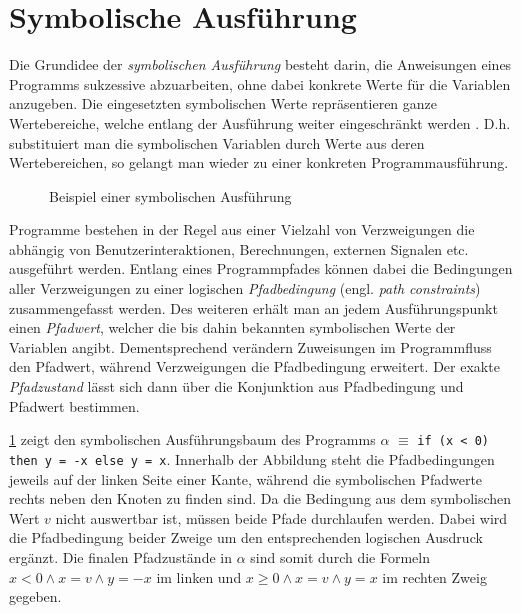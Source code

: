 \section{Symbolische Ausführung}

Die Grundidee der \emph{symbolischen Ausführung} besteht darin, die Anweisungen eines Programms sukzessive abzuarbeiten, ohne dabei konkrete Werte für die Variablen anzugeben. Die eingesetzten symbolischen Werte repräsentieren ganze Wertebereiche, welche entlang der Ausführung weiter eingeschränkt werden \cite{Kneuper2008}. D.h. substituiert man die symbolischen Variablen durch Werte aus deren Wertebereichen, so gelangt man wieder zu einer konkreten Programmausführung.

\begin{figure}[t]
	\centering
	
	\caption{Beispiel einer symbolischen Ausführung}
	\label{fig:tree}
\end{figure}

Programme bestehen in der Regel aus einer Vielzahl von Verzweigungen die abhängig von Benutzerinteraktionen, Berechnungen, externen Signalen etc. ausgeführt werden. Entlang eines Programmpfades können dabei die Bedingungen aller Verzweigungen zu einer logischen \emph{Pfadbedingung} (engl. \emph{path constraints}) zusammengefasst werden. Des weiteren erhält man an jedem Ausführungspunkt einen \emph{Pfadwert}, welcher die bis dahin bekannten symbolischen Werte der Variablen angibt. Dementsprechend verändern Zuweisungen im Programmfluss den Pfadwert, während Verzweigungen die Pfadbedingung erweitert. Der exakte \emph{Pfadzustand} lässt sich dann über die Konjunktion aus Pfadbedingung und Pfadwert bestimmen.

\cref{fig:tree} zeigt den symbolischen Ausführungsbaum des Programms $\alpha$ $\equiv$ \texttt{if \linebreak (x < 0) then y = -x else y = x}. Innerhalb der Abbildung steht die Pfadbedingungen jeweils auf der linken Seite einer Kante, während die symbolischen Pfadwerte rechts neben den Knoten zu finden sind. Da die Bedingung aus dem symbolischen Wert $v$ nicht auswertbar ist, müssen beide Pfade durchlaufen werden. Dabei wird die Pfadbedingung beider Zweige um den entsprechenden logischen Ausdruck ergänzt. Die finalen Pfadzustände in $\alpha$ sind somit durch die Formeln $x < 0 \wedge x = v \wedge y = -x$ im linken und $x \geq 0 \wedge x = v \wedge y = x$ im rechten Zweig gegeben.

